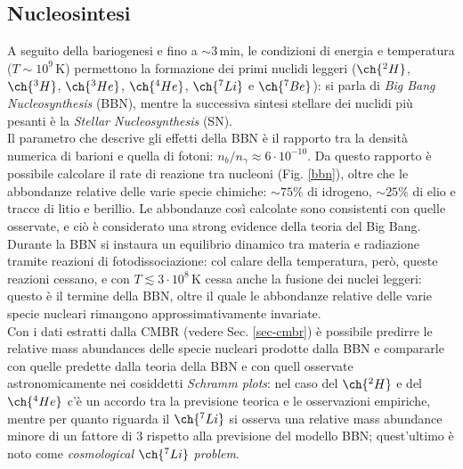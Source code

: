 \subsection{Nucleosintesi}

A seguito della bariogenesi e fino a $ \sim 3 \,\text{min} $, le condizioni di energia e temperatura ($ T \sim 10^9 \,\text{K} $) permettono la formazione dei primi nuclidi leggeri ($ \ch{^2 H} $, $ \ch{^3 H} $, $ \ch{^3 He} $, $ \ch{^4 He} $, $ \ch{^7 Li} $ e $ \ch{^7 Be} $): si parla di \textit{Big Bang Nucleosynthesis} (BBN), mentre la successiva sintesi stellare dei nuclidi più pesanti è la \textit{Stellar Nucleosynthesis} (SN).\\
Il parametro che descrive gli effetti della BBN è il rapporto tra la densità numerica di barioni e quella di fotoni: $ n_b / n_\gamma \approx 6 \cdot 10^{-10} $. Da questo rapporto è possibile calcolare il rate di reazione tra nucleoni (Fig. \ref{bbn}), oltre che le abbondanze relative delle varie specie chimiche: $ \sim 75\% $ di idrogeno, $ \sim 25\% $ di elio e tracce di litio e berillio. Le abbondanze così calcolate sono consistenti con quelle osservate, e ciò è considerato una strong evidence della teoria del Big Bang.\\
Durante la BBN si instaura un equilibrio dinamico tra materia e radiazione tramite reazioni di fotodissociazione: col calare della temperatura, però, queste reazioni cessano, e con $ T \lesssim 3 \cdot 10^8 \,\text{K} $ cessa anche la fusione dei nuclei leggeri: questo è il termine della BBN, oltre il quale le abbondanze relative delle varie specie nucleari rimangono approssimativamente invariate.\\
Con i dati estratti dalla CMBR (vedere Sec. \ref{sec-cmbr}) è possibile predirre le relative mass abundances delle specie nucleari prodotte dalla BBN e compararle con quelle predette dalla teoria della BBN e con quell osservate astronomicamente nei cosiddetti \textit{Schramm plots}: nel caso del $ \ch{^2 H} $ e del $ \ch{^4 He} $ c'è un accordo tra la previsione teorica e le osservazioni empiriche, mentre per quanto riguarda il $ \ch{^7 Li} $ si osserva una relative mass abundance minore di un fattore di 3 rispetto alla previsione del modello BBN; quest'ultimo è noto come \textit{cosmological} $ \ch{^7 Li} $ \textit{problem}.\\
